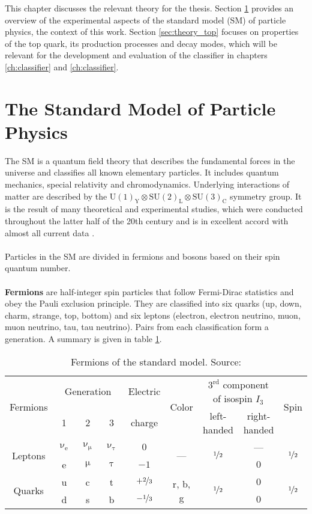 This chapter discusses the relevant theory for the thesis. Section \ref{sec:theory_sm} provides an overview of the experimental aspects of the standard model (SM) of particle physics, the context of this work. Section \ref{sec:theory_top} focuses on properties of the top quark, its production processes and decay modes, which will be relevant for the development and evaluation of the classifier in chapters \ref{ch:classifier} and \ref{ch:classifier}.
\section{The Standard Model of Particle Physics}
\label{sec:theory_sm}
The SM is a quantum field theory that describes the fundamental forces in the universe and classifies all known elementary particles. It includes quantum mechanics, special relativity and chromodynamics. Underlying interactions of matter are described by the $\textrm{U}(1)_\textrm{Y}\otimes \textrm{SU}(2)_\textrm{L}\otimes \textrm{SU}(3)_\textrm{C}$ symmetry group. It is the result of many theoretical and experimental studies, which were conducted throughout the latter half of the 20th century and is in excellent accord with almost all current data \cite{RevModPhys.71.S96}.\\ \\
Particles in the SM are divided in fermions and bosons based on their spin quantum number.\\ \\
\textbf{Fermions} are half-integer spin particles that follow Fermi-Dirac statistics and obey the Pauli exclusion principle. They are classified into six quarks (up, down, charm, strange, top, bottom) and six leptons (electron, electron neutrino, muon, muon neutrino, tau, tau neutrino). Pairs from each classification form a generation. A summary is given in table \ref{tab:ch_1_sm_fermions}.
\begin{table}[h]
\caption[Fermions of the SM]{Fermions of the standard model. Source: \cite{povh}}
\label{tab:ch_1_sm_fermions}
\begin{tabular}{ccccccccc}
\toprule
\multirow{2}{*}{Fermions} & \multicolumn{3}{c}{Generation} & {Electric} & \multirow{2}{*}{Color} & \multicolumn{2}{c}{$3^{\mathrm{rd}}$ component of isospin $I_3$} & \multirow{2}{*}{Spin}\\
& 1 & 2 & 3 & {charge} & & left-handed & right-handed & \\
\midrule
\multirow{2}{*}{Leptons} & $\upnu_\textrm{e}$ & $\upnu_\upmu$ & $\upnu_\uptau$ & {$0$} & \multirow{2}{*}{---} & \multirow{2}{*}{$\nicefrac{1}{2}$} & --- & \multirow{2}{*}{$\nicefrac{1}{2}$}\\
& e & $\upmu$ & $\uptau$ & {$-1$} & & & {$0$} &\\
\midrule
\multirow{2}{*}{Quarks} & u & c & t & $+\nicefrac{2}{3}$ & \multirow{2}{*}{r, b, g} & \multirow{2}{*}{$\nicefrac{1}{2}$} & {$0$} & \multirow{2}{*}{$\nicefrac{1}{2}$}\\
& d & s & b & $-\nicefrac{1}{3}$ & & & {$0$} & \\
\bottomrule
\end{tabular}
\end{table}
